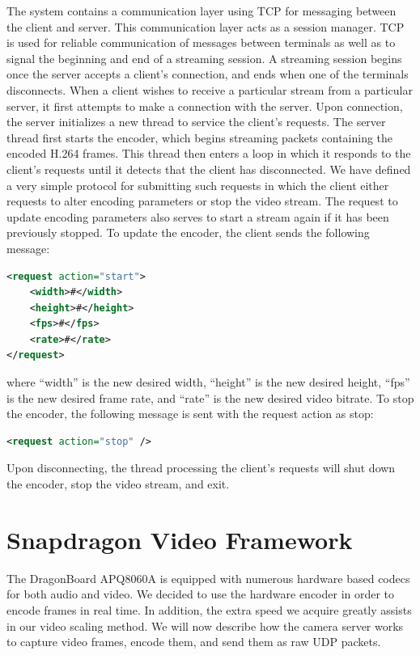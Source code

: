 \documentclass[a4paper,12pt]{article}
\begin{document}
The system contains a communication layer using TCP for messaging between the client and server. This communication layer acts as a session manager. TCP is used for reliable communication of messages between terminals as well as to signal the beginning and end of a streaming session. A streaming session begins once the server accepts a client's connection, and ends when one of the terminals disconnects. When a client wishes to receive a particular stream from a particular server, it first attempts to make a connection with the server. Upon connection, the server initializes a new thread to service the client’s requests. The server thread first starts the encoder, which begins streaming packets containing the encoded H.264 frames. This thread then enters a loop in which it responds to the client's requests until it detects that the client has disconnected. We have defined a very simple protocol for submitting such requests in which the client either requests to alter encoding parameters or stop the video stream. The request to update encoding parameters also serves to start a stream again if it has been previously stopped. To update the encoder, the client sends the following message:
%
\begin{lstlisting}[language=xml, frame=single]
<request action="start">
	<width>#</width>
	<height>#</height>
	<fps>#</fps>
	<rate>#</rate>
</request>
\end{lstlisting}
where ``width'' is the new desired width, ``height'' is the new desired height, ``fps'' is the new desired frame rate, and ``rate'' is the new desired video bitrate. To stop the encoder, the following message is sent with the request action as stop:
%
\begin{lstlisting}[language=xml, frame=single]
<request action="stop" />
\end{lstlisting}
Upon disconnecting, the thread processing the client's requests will shut down the encoder, stop the video stream, and exit.


\section{Snapdragon Video Framework}
\label{sec:Snapdragon}

The DragonBoard APQ8060A is equipped with numerous hardware based codecs for both audio and video. We decided to use the hardware encoder in order to encode frames in real time. In addition, the extra speed we acquire greatly assists in our video scaling method. We will now describe how the camera server works to capture video frames, encode them, and send them as raw UDP packets.
\end{document}
